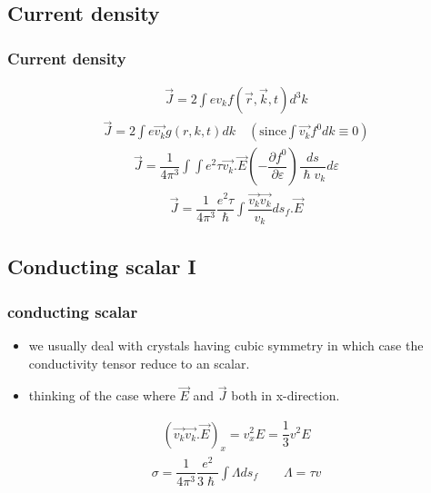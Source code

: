 \documentclass{beamer}
\begin{document}
\subsection{Current density}
\begin{frame}
\frametitle{Current density}
\pause
\begin{align*}
\vec{J} = 2 \int e v_k f (\vec{r},\vec{k},t) d^3k
\end{align*}
\pause
\begin{align*}
\vec{J} = 2 \int e \vec{v_k} g (r,k,t) dk \quad (\text{since} \int \vec{v_k} f^0 dk \equiv 0) 
\end{align*}
\pause
\begin{align*}
\vec{J} = \dfrac{1}{4 \pi ^3} \int \int e^2 \tau \vec{v_k}.\vec{E} (- \dfrac{\partial f^0}{\partial \varepsilon}) \dfrac{ds}{\hslash v_k}d\varepsilon 
\end{align*}
\pause
\begin{align*}
\vec{J} = \dfrac{1}{4 \pi ^3} \dfrac{e^2 \tau}{\hslash} \int \dfrac{\vec{v_k}\vec{v_k}}{v_k}ds_f .\vec{E}
\end{align*}
\end{frame}
\subsection{Conducting scalar I}
\begin{frame}
\frametitle{conducting scalar}
\begin{itemize}
\item we usually deal with crystals having cubic symmetry in which case the conductivity tensor reduce to  an scalar.
\pause
\item thinking of the case where $\vec{E}$ and $\vec{J}$ both in x-direction.
\end{itemize}
\pause
\begin{align*}
(\vec{v_k}\vec{v_k}.\vec{E})_x = v_x^2 E = \dfrac{1}{3} v^2 E
\end{align*}
\pause
\begin{align*}
\sigma = \dfrac{1}{4 \pi ^3} \dfrac{e^2}{3 \hslash} \int \Lambda ds_f  \qquad \Lambda = \tau v
\end{align*}
\end{frame}
\end{document}

